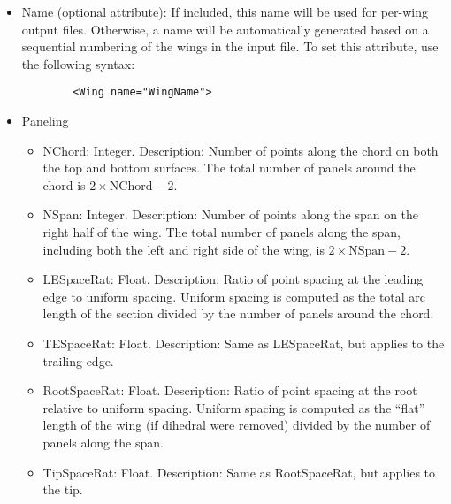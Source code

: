 \documentclass[11pt]{article}
\begin{document}
\begin{itemize}
	\item Name (optional attribute): If included, this name will be used for
		per-wing output files. Otherwise, a name will be automatically generated
		based on a sequential numbering of the wings in the input file. To set
		this attribute, use the following syntax:
		\begin{verbatim}
		<Wing name="WingName">
		\end{verbatim}
	\item Paneling
	\begin{itemize}
		\item NChord: Integer. Description: Number of points along the chord
			on both the top and bottom surfaces. The total number of panels
			around the chord is $2\times\text{NChord} - 2$.
		\item NSpan: Integer. Description: Number of points along the span on
			the right half of the wing. The total number of panels along the
			span, including both the left and right side of the wing, is
			$2\times\text{NSpan} - 2$.
		\item{LESpaceRat}: Float. Description: Ratio of point spacing at the
			leading edge to uniform spacing. Uniform spacing is computed as the
			total arc length of the section divided by the number of panels
			around the chord.
		\item{TESpaceRat}: Float. Description: Same as LESpaceRat, but applies
			to the trailing edge.
		\item{RootSpaceRat}: Float. Description: Ratio of point spacing at the
			root relative to uniform spacing. Uniform spacing is computed as the
			``flat'' length of the wing (if dihedral were removed) divided by
			the number of panels along the span.
		\item{TipSpaceRat}: Float. Description: Same as RootSpaceRat, but
			applies to the tip.
	\end{itemize}
\end{itemize}
\end{document}

